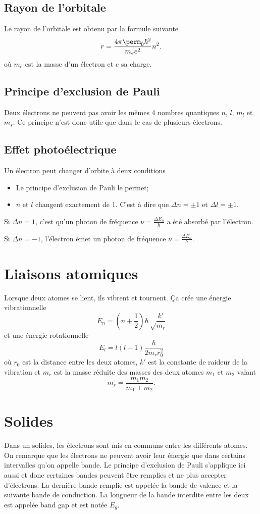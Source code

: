 \subsection{Rayon de l'orbitale}
Le rayon de l'orbitale est obtenu par la formule suivante
\[ r = \frac{4\pi\perm_0\hbar^2}{m_ee^2}n^2. \]
où $m_e$ est la masse d'un électron et $e$ sa charge.

\subsection{Principe d'exclusion de Pauli}
Deux électrons ne peuvent pas avoir les mêmes 4 nombres quantiques
$n$, $l$, $m_l$ et $m_s$.
Ce principe n'est donc utile que dans le cas de plusieurs électrons.

\subsection{Effet photoélectrique}
Un électron peut changer d'orbite à deux conditions
\begin{itemize}
  \item Le principe d'exclusion de Pauli le permet;
  \item $n$ et $l$ changent exactement de 1.
    C'est à dire que $\Delta n = \pm 1$ et $\Delta l = \pm 1$.
\end{itemize}

Si $\Delta n = 1$, c'est qu'un photon de fréquence
$\nu = \frac{\Delta E_n}{h}$ a été absorbé par l'électron.

Si $\Delta n = -1$, l'électron émet un photon de fréquence
$\nu = \frac{\Delta E_n}{h}$.

\section{Liaisons atomiques}
Lorsque deux atomes se lient,
ils vibrent et tournent.
Ça crée une énergie vibrationnelle
\[ E_n = \left(n + \frac{1}{2}\right)\hbar\sqrt\frac{k'}{m_r} \]
et une énergie rotationnelle
\[ E_l = l(l+1) \frac{\hbar}{2m_rr_0^2} \]
où $r_0$ est la distance entre les deux atomes,
$k'$ est la constante de raideur de la vibration et
$m_r$ est la masse réduite des masses des deux atomes $m_1$ et $m_2$ valant
\[ m_r = \frac{m_1m_2}{m_1+m_2}. \]

\section{Solides}
Dans un solides,
les électrons sont mis en communs entre les différents atomes.
On remarque que les électrons ne peuvent avoir leur énergie que dans certains
intervalles qu'on appelle bande.
Le principe d'exclusion de Pauli s'applique ici aussi et donc certaines
bandes peuvent être remplies et ne plus accepter d'électrons.
La dernière bande remplie est appelée la bande de valence et la suivante
bande de conduction.
La longueur de la bande interdite entre les deux est appelée
band gap et est notée $E_g$.

